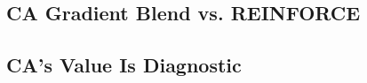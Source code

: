 \documentclass[letterpaper]{article} %
\begin{document}
\subsection{CA Gradient Blend vs. REINFORCE}

\subsection{CA's Value Is Diagnostic}

\end{document}
